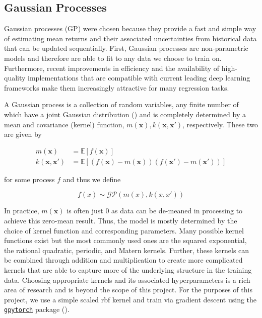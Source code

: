 \documentclass[12pt]{article}
\newcommand{\E}{\mathbb{E}}
\def\code#1{\texttt{#1}}
\begin{document}
\subsection{Gaussian Processes}

Gaussian processes (GP) were chosen because they provide a fast and simple way of estimating mean returns and their associated uncertainties from historical data that can be updated sequentially. First, Gaussian processes are non-parametric models and therefore are able to fit to any data we choose to train on. Furthermore, recent improvements in efficiency and the availability of high-quality implementations that are compatible with current leading deep learning frameworks make them increasingly attractive for many regression tasks.

A Gaussian process is a collection of random variables, any finite number of which have a joint Gaussian distribution (\cite{Rasmussen2006}) and is completely determined by a mean and covariance (kernel) function, $m(\bm{x}), k(\bm{x},\bm{x}')$, respectively. These two are given by

\begin{align}
m(\bm{x}) & = \E[f(\bm{x})] \\
k(\bm{x},\bm{x}') & = \E[(f(\bm{x}) - m(\bm{x}))(f(\bm{x}') - m(\bm{x}'))]
\label{eq:gp eq}
\end{align}

for some process $f$ and thus we define

\begin{equation}
f(x) \sim \mathcal{GP}(m(x), k(x,x'))
\label{eq:gp def}
\end{equation}

In practice, $m(\bm{x})$ is often just $0$ as data can be de-meaned in processing to achieve this zero-mean result. Thus, the model is mostly determined by the choice of kernel function and corresponding parameters. Many possible kernel functions exist but the most commonly used ones are the squared exponential, the rational quadratic, periodic, and Matern kernels. Further, these kernels can be combined through addition and multiplication to create more complicated kernels that are able to capture more of the underlying structure in the training data. Choosing appropriate kernels and its associated hyperparameters is a rich area of research and is beyond the scope of this project. For the purposes of this project, we use a simple scaled rbf kernel and train via gradient descent using the \href{https://github.com/cornellius-gp/gpytorch}{\code{gpytorch}} package (\cite{gardner2018gpytorch}).
\end{document}
